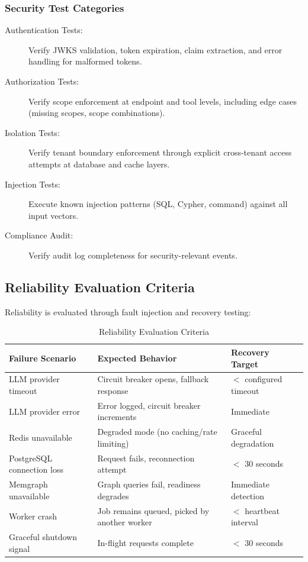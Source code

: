 \documentclass[a4paper,twoside]{sapthesis}
\begin{document}
\subsubsection{Security Test Categories}

\begin{description}
    \item[Authentication Tests:] Verify JWKS validation, token expiration, claim extraction, and error handling for malformed tokens.
    
    \item[Authorization Tests:] Verify scope enforcement at endpoint and tool levels, including edge cases (missing scopes, scope combinations).
    
    \item[Isolation Tests:] Verify tenant boundary enforcement through explicit cross-tenant access attempts at database and cache layers.
    
    \item[Injection Tests:] Execute known injection patterns (SQL, Cypher, command) against all input vectors.
    
    \item[Compliance Audit:] Verify audit log completeness for security-relevant events.
\end{description}

\subsection{Reliability Evaluation Criteria}
\label{subsec:reliability-criteria}

Reliability is evaluated through fault injection and recovery testing:

\begin{table}[htbp]
\centering
\caption{Reliability Evaluation Criteria}
\label{tab:reliability-eval}
\small
\begin{tabularx}{\textwidth}{|l|X|l|}
\hline
\textbf{Failure Scenario} & \textbf{Expected Behavior} & \textbf{Recovery Target} \\
\midrule
LLM provider timeout & Circuit breaker opens, fallback response & $<$ configured timeout \\
\midrule
LLM provider error & Error logged, circuit breaker increments & Immediate \\
\midrule
Redis unavailable & Degraded mode (no caching/rate limiting) & Graceful degradation \\
\midrule
PostgreSQL connection loss & Request fails, reconnection attempt & $<$ 30 seconds \\
\midrule
Memgraph unavailable & Graph queries fail, readiness degrades & Immediate detection \\
\midrule
Worker crash & Job remains queued, picked by another worker & $<$ heartbeat interval \\
\midrule
Graceful shutdown signal & In-flight requests complete & $<$ 30 seconds \\
\midrule
\end{tabularx}
\end{table}
\end{document}
